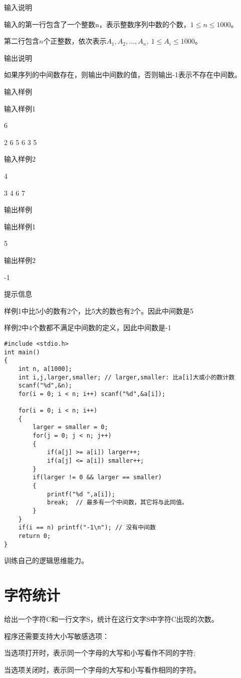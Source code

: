 输入说明

输入的第一行包含了一个整数n，表示整数序列中数的个数，$1\le n\le 1000$。
 
第二行包含$n$个正整数，依次表示$A_1, A_2, \dots, A_n,~1\le A_i\le 1000$。 

输出说明

如果序列的中间数存在，则输出中间数的值，否则输出-1表示不存在中间数。

输入样例

输入样例1 

6 

2 6 5 6 3 5 

输入样例2 

4 

3 4 6 7 

输出样例

输出样例1 

5 

输出样例2 

-1

提示信息

样例1中比5小的数有2个，比5大的数也有2个。因此中间数是5 

样例2中4个数都不满足中间数的定义，因此中间数是-1

\begin{lstlisting}
#include <stdio.h>
int main()
{
	int n, a[1000];
	int i,j,larger,smaller;	// larger,smaller: 比a[i]大或小的数计数
	scanf("%d",&n);
	for(i = 0; i < n; i++) scanf("%d",&a[i]);
	
	for(i = 0; i < n; i++)
	{
		larger = smaller = 0;
		for(j = 0; j < n; j++)
		{
			if(a[j] >= a[i]) larger++; 
			if(a[j] <= a[i]) smaller++;
		}
		if(larger != 0 && larger == smaller) 
		{
			printf("%d ",a[i]); 
			break;  // 最多有一个中间数，其它将与此同值。 
		}
	}
	if(i == n) printf("-1\n"); // 没有中间数 
	return 0;
}
\end{lstlisting}

\begin{note}[要点]
	训练自己的逻辑思维能力。
\end{note}

\section{字符统计}
给出一个字符C和一行文字S，统计在这行文字S中字符C出现的次数。

程序还需要支持大小写敏感选项：

当选项打开时，表示同一个字母的大写和小写看作不同的字符;

当选项关闭时，表示同一个字母的大写和小写看作相同的字符。

